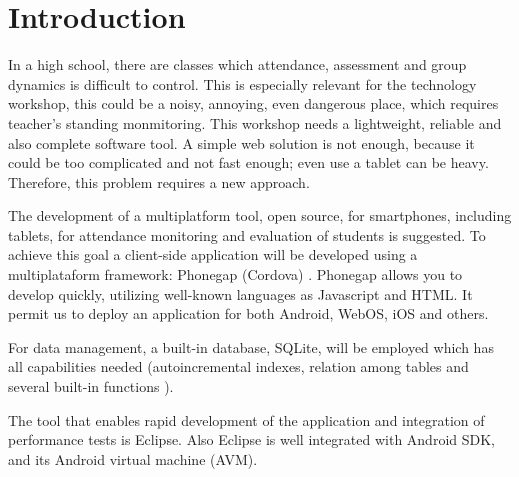 \chapter{Introduction}
In a high school, there are classes which attendance, assessment and group dynamics is difficult to control.
This is especially relevant for the technology workshop, this could be a noisy, annoying, even dangerous place, which requires teacher's standing monmitoring.
 This workshop needs a lightweight,
reliable and also complete  software tool. A simple web solution is not enough, because it could be too complicated and not fast enough; even use a tablet can be heavy. Therefore, this problem requires a new approach.
  
The development of a multiplatform tool, open source, for smartphones, including tablets, for attendance monitoring and evaluation of students is suggested.
 To achieve this goal a client-side application will be developed using a multiplataform framework: Phonegap (Cordova) \cite{PhoneGap}.
Phonegap allows you to develop quickly, utilizing well-known languages as Javascript and HTML. It permit us to deploy an application for both
 Android, WebOS, iOS and others.    

For data management, a built-in database, SQLite, will be employed which has all capabilities needed (autoincremental indexes, relation among tables and several built-in functions ).
  
The tool that enables rapid development of the application and integration of performance tests is Eclipse. Also Eclipse is well integrated with Android SDK, and its Android virtual machine (AVM).

